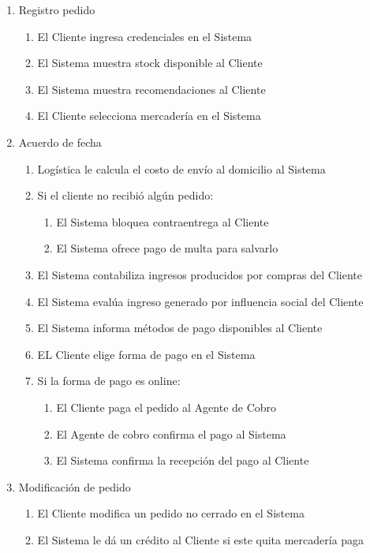\begin{enumerate}
 \item Registro pedido
  \begin{enumerate}
    \item El Cliente ingresa credenciales en el Sistema
    \item El Sistema muestra stock disponible al Cliente
    \item El Sistema muestra recomendaciones al Cliente
    \item El Cliente selecciona mercadería en el Sistema
  \end{enumerate}
 
 \item Acuerdo de fecha
  \begin{enumerate}
    \item Logística le calcula el costo de envío al domicilio al Sistema
    \item Si el cliente no recibi\'o alg\'un pedido: 
      \begin{enumerate}
      \item El Sistema bloquea contraentrega al Cliente
      \item El Sistema ofrece pago de multa para salvarlo
      \end{enumerate}
    \item El Sistema contabiliza ingresos producidos por compras del Cliente
    \item El Sistema evalúa ingreso generado por influencia social del Cliente
    \item El Sistema informa métodos de pago disponibles al Cliente
    \item EL Cliente elige forma de pago en el Sistema
    \item Si la forma de pago es online: 
    \begin{enumerate}
      \item El Cliente paga el pedido al Agente de Cobro
      \item El Agente de cobro confirma el pago al Sistema
      \item El Sistema confirma la recepción del pago al Cliente
    \end{enumerate}
  \end{enumerate}
  
 \item Modificaci\'on de pedido
  \begin{enumerate}
    \item El Cliente modifica un pedido no cerrado en el Sistema
    \item El Sistema le dá un crédito al Cliente si este quita mercadería paga
  \end{enumerate}


\end{enumerate}
